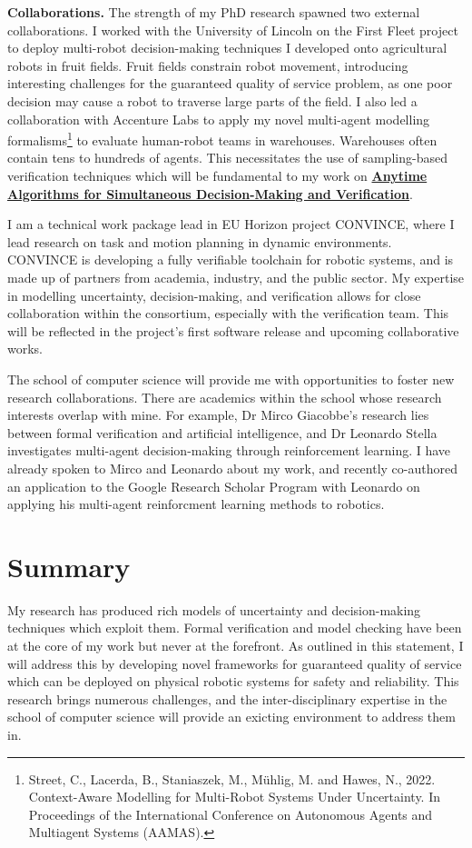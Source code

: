 \documentclass[12pt]{article}
\newcommand{\anytime}{\hyperlink{topicthree}{\textbf{Anytime Algorithms for Simultaneous Decision-Making and Verification}}}
\begin{document}
\vspace*{1ex}\noindent\textbf{Collaborations.} The strength of my PhD research spawned two external collaborations.
%
I worked with the University of Lincoln on the First Fleet project to deploy multi-robot decision-making techniques I developed onto agricultural robots in fruit fields.
%
Fruit fields constrain robot movement, introducing interesting challenges for the guaranteed quality of service problem, as one poor decision may cause a robot to traverse large parts of the field.
%
I also led a collaboration with Accenture Labs to apply my novel multi-agent modelling formalisms\footnote{Street, C., Lacerda, B., Staniaszek, M., Mühlig, M. and Hawes, N., 2022. Context-Aware Modelling for Multi-Robot Systems Under Uncertainty. In Proceedings of the International Conference on Autonomous Agents
and Multiagent Systems (AAMAS).} to evaluate human-robot teams in warehouses.
%
Warehouses often contain tens to hundreds of agents.
%
This necessitates the use of sampling-based verification techniques which will be fundamental to my work on \anytime. 


I am a technical work package lead in EU Horizon project CONVINCE, where I lead research on task and motion planning in dynamic environments.
%
CONVINCE is developing a fully verifiable toolchain for robotic systems, and is made up of partners from academia, industry, and the public sector.
%
My expertise in modelling uncertainty, decision-making, and verification allows for close collaboration within the consortium, especially with the verification team.
%
This will be reflected in the project's first software release and upcoming collaborative works.

The school of computer science will provide me with opportunities to foster new research collaborations.
%
There are academics within the school whose research interests overlap with mine.
%
For example, Dr Mirco Giacobbe's research lies between formal verification and artificial intelligence, and Dr Leonardo Stella investigates multi-agent decision-making through reinforcement learning.
%
I have already spoken to Mirco and Leonardo about my work, and recently co-authored an application to the Google Research Scholar Program with Leonardo on applying his multi-agent reinforcment learning methods to robotics.


\section*{Summary}

My research has produced rich models of uncertainty and decision-making techniques which exploit them.
%
Formal verification and model checking have been at the core of my work but never at the forefront.
%
As outlined in this statement, I will address this by developing novel frameworks for guaranteed quality of service which can be deployed on physical robotic systems for safety and reliability.
%
This research brings numerous challenges, and the inter-disciplinary expertise in the school of computer science will provide an exicting environment to address them in.
\end{document}

